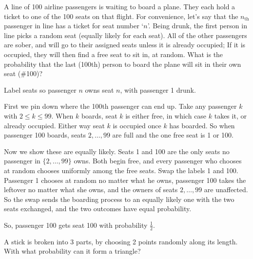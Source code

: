 \begin{problem}
A line of 100 airline passengers is waiting to board a plane. They each hold a ticket to one of the 100 seats on that flight. For convenience, let's say that the $n_{\text{th}}$ passenger in line has a ticket for seat number `$n$'. Being drunk, the first person in line picks a random seat (equally likely for each seat). All of the other passengers are sober, and will go to their assigned seats unless it is already occupied; If it is occupied, they will then find a free seat to sit in, at random. What is the probability that the last (100th) person to board the plane will sit in their own seat (\#100)?
\end{problem}

\begin{solution}
Label seats so passenger $n$ owns seat $n$, with passenger 1 drunk.

First we pin down where the 100th passenger can end up. Take any passenger $k$ with $2 \le k \le 99$. When $k$ boards, seat $k$ is either free, in which case $k$ takes it, or already occupied. Either way seat $k$ is occupied once $k$ has boarded. So when passenger 100 boards, seats $2,\dots,99$ are full and the one free seat is 1 or 100.

Now we show these are equally likely. Seats 1 and 100 are the only seats no passenger in $\{2,\dots,99\}$ owns. Both begin free, and every passenger who chooses at random chooses uniformly among the free seats. Swap the labels 1 and 100. Passenger 1 chooses at random no matter what he owns, passenger 100 takes the leftover no matter what she owns, and the owners of seats $2,\dots,99$ are unaffected. So the swap sends the boarding process to an equally likely one with the two seats exchanged, and the two outcomes have equal probability.

So, passenger 100 gets seat 100 with probability $\tfrac12$.
\end{solution}

\begin{problem}
A stick is broken into 3 parts, by choosing 2 points randomly along its length. With what probability can it form a triangle?
\end{problem}


